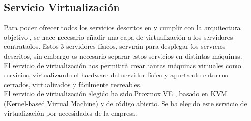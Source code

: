         \subsection{Servicio Virtualización}
                \begin{text}
                        Para poder ofrecer todos los servicios descritos en  y cumplir con la arquitectura objetivo , se hace necesario añadir una capa de virtualización a los servidores contratados. Estos 3 servidores físicos, servirán para desplegar los servicios descritos, sin embargo es necesario separar estos servicios en distintas máquinas. El servicio de virtualización nos permitirá crear tantas máquinas virtuales como servicios, virtualizando el hardware del servidor físico y aportando entornos cerrados, virtualizados y fácilmente recreables. \\
                        El servicio de virtualización elegido ha sido Proxmox VE \cite{proxmox:online}, basado en KVM (Kernel-based Virtual Machine) y de código abierto. Se ha elegido este servicio de virtualización por necesidades de la empresa.
                \end{text}
